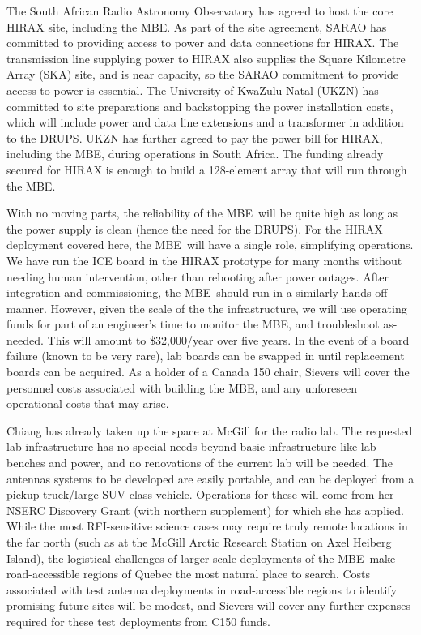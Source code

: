 \documentclass[letterpaper,11pt,preprint]{aastex}
\newcommand{\mbe}{{\rm MBE}}
\begin{document}
The South African Radio Astronomy Observatory has agreed to host the
core HIRAX site, including the \mbe.  As part of the site agreement,
SARAO has committed to providing access to power and data connections
for HIRAX.  The transmission line supplying power to HIRAX also
supplies the Square Kilometre Array (SKA) site, and is near capacity, so the SARAO commitment
to provide access to power is essential.  The University of
KwaZulu-Natal (UKZN) has committed to site preparations and
backstopping the power installation costs, which will include power
and data line extensions and a transformer in addition to the DRUPS.
UKZN has further agreed to pay the power bill for HIRAX, including the
\mbe, during operations in South Africa.  The funding already secured
for HIRAX is enough to build a 128-element array that will run through
the \mbe.

With no moving parts, the reliability of the \mbe\ will be quite high
as long as the power supply is clean (hence the need for the DRUPS).
For the HIRAX deployment covered here, the \mbe\ will have a single
role, simplifying operations.  We have run the ICE board in the HIRAX
prototype for many months without needing human intervention, other
than rebooting after power outages.  After integration and
commissioning, the \mbe\ should run in a similarly hands-off manner.
However, given the scale of the the infrastructure, we will use
operating funds for part of an engineer's time to monitor the \mbe,
and troubleshoot as-needed.  This will amount to \$32,000/year over
five years.  In the event of a board failure (known to
be very rare), lab boards can be swapped in until replacement boards
can be acquired.  As a holder of a Canada 150 chair, Sievers will
cover the personnel costs associated with building the \mbe, and any
unforeseen operational costs that may arise.

Chiang has already taken up the space at McGill for the radio lab.
The requested lab infrastructure has no special needs beyond basic
infrastructure like lab benches and power, and no renovations of the
current lab will be needed.  The antennas systems to be developed are
easily portable, and can be deployed from a pickup truck/large
SUV-class vehicle.  Operations for these will come from her NSERC
Discovery Grant (with northern supplement) for which she has applied.
While the most RFI-sensitive science cases may require truly remote
locations in the far north (such as at the McGill Arctic Research
Station on Axel Heiberg Island), the logistical challenges of larger
scale deployments of the \mbe\ make road-accessible regions of Quebec
the most natural place to search.  Costs associated with test antenna
deployments in road-accessible regions to identify promising future
sites will be modest, and Sievers will cover any further expenses
required for these test deployments from C150 funds.
\end{document}

